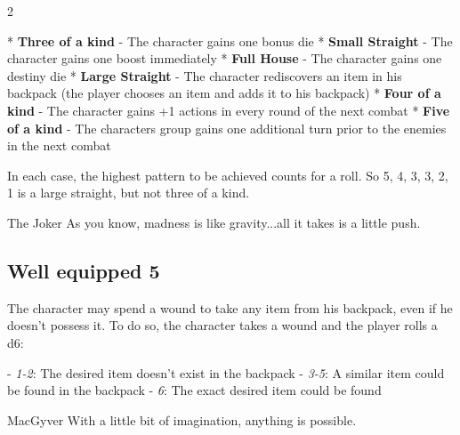 \begin{multicols}{2}
\begin{tcolorbox}
* \textbf{Three of a kind} - The character gains one bonus die
* \textbf{Small Straight} - The character gains one boost immediately
* \textbf{Full House} - The character gains one destiny die
* \textbf{Large Straight} - The character rediscovers an item in his backpack (the player chooses an item and adds it to his backpack)
* \textbf{Four of a kind} - The character gains +1 actions in every round of the next combat
* \textbf{Five of a kind} - The characters group gains one additional turn prior to the enemies in the next combat

In each case, the highest pattern to be achieved counts for a roll. So 5, 4, 3, 3, 2, 1 is a large straight, but not three of a kind.

\begin{pquote}{The Joker}
As you know, madness is like gravity...all it takes is a little push.
\end{pquote}

\vspace{3mm}



\end{tcolorbox}

\begin{tcolorbox}
    \subsection*{Well equipped \hfill \small{5 }}
    \tcblower
The character may spend a wound to take any item from his backpack, even if he doesn't possess it. To do so, the character takes a wound and the player rolls a d6:

- \textit{1-2}: The desired item doesn't exist in the backpack
- \textit{3-5}: A similar item could be found in the backpack
- \textit{6}: The exact desired item could be found

\begin{pquote}{MacGyver}
With a little bit of imagination, anything is possible.
\end{pquote}

\vspace{3mm}



\end{tcolorbox}


\end{multicols}
